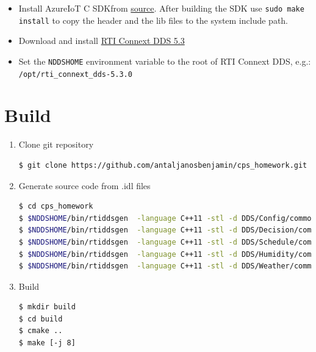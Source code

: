 \documentclass{article}
\begin{document}
\begin{itemize}
\item Install AzureIoT C SDKfrom \href{https://github.com/Azure/azure-iot-sdk-c/blob/master/doc/devbox_setup.md}{source}. After building the SDK use \verb+sudo make install+ to copy the header and the lib files to the system include path.
\item Download and install \href{https://www.rti.com/gettingstarted/installlinux_secure}{RTI Connext DDS 5.3}
\item Set the \verb+NDDSHOME+ environment variable to the root of RTI Connext DDS, e.g.: \verb+/opt/rti_connext_dds-5.3.0+
\end{itemize}

\section{Build}
\begin{enumerate}
\item Clone git repository
\begin{lstlisting}
$ git clone https://github.com/antaljanosbenjamin/cps_homework.git
\end{lstlisting}
\item Generate source code from .idl files
\begin{lstlisting}[language=bash]
$ cd cps_homework
$ $NDDSHOME/bin/rtiddsgen  -language C++11 -stl -d DDS/Config/common -replace idl_files/Config.idl
$ $NDDSHOME/bin/rtiddsgen  -language C++11 -stl -d DDS/Decision/common -replace idl_files/Decision.idl
$ $NDDSHOME/bin/rtiddsgen  -language C++11 -stl -d DDS/Schedule/common -replace idl_files/Schedule.idl
$ $NDDSHOME/bin/rtiddsgen  -language C++11 -stl -d DDS/Humidity/common -replace idl_files/UvegHaz.idl
$ $NDDSHOME/bin/rtiddsgen  -language C++11 -stl -d DDS/Weather/common -replace idl_files/Weather.idl
\end{lstlisting}
\item Build
\begin{lstlisting}
$ mkdir build
$ cd build
$ cmake ..
$ make [-j 8]
\end{lstlisting}
\end{enumerate}
\end{document}
